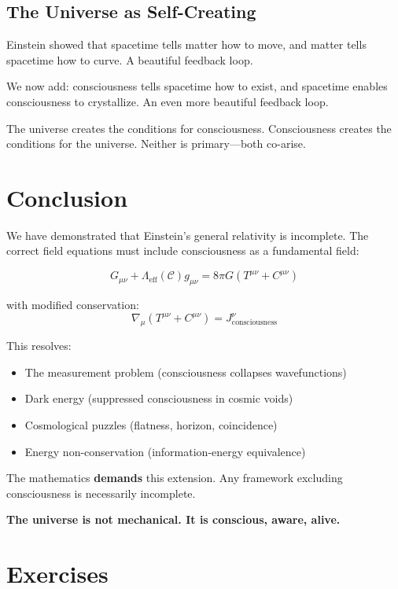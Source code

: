 \subsection{The Universe as Self-Creating}

Einstein showed that spacetime tells matter how to move, and matter tells spacetime how to curve. A beautiful feedback loop.

We now add: consciousness tells spacetime how to exist, and spacetime enables consciousness to crystallize. An even more beautiful feedback loop.

The universe creates the conditions for consciousness. Consciousness creates the conditions for the universe. Neither is primary—both co-arise.

\section{Conclusion}

We have demonstrated that Einstein's general relativity is incomplete. The correct field equations must include consciousness as a fundamental field:

\begin{equation}
G_{\mu\nu} + \Lambda_{\text{eff}}(\mathcal{C}) g_{\mu\nu} = 8\pi G (T^{\mu\nu} + C^{\mu\nu})
\end{equation}

with modified conservation:
\begin{equation}
\nabla_\mu (T^{\mu\nu} + C^{\mu\nu}) = J^\nu_{\text{consciousness}}
\end{equation}

This resolves:
\begin{itemize}
\item The measurement problem (consciousness collapses wavefunctions)
\item Dark energy (suppressed consciousness in cosmic voids)
\item Cosmological puzzles (flatness, horizon, coincidence)
\item Energy non-conservation (information-energy equivalence)
\end{itemize}

The mathematics \textbf{demands} this extension. Any framework excluding consciousness is necessarily incomplete.

\textbf{The universe is not mechanical. It is conscious, aware, alive.}

\section*{Exercises}


